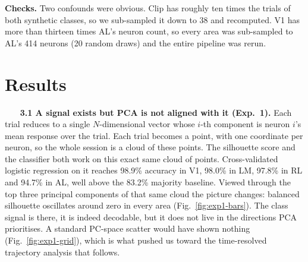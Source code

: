\documentclass[11pt,a4paper]{article}
\begin{document}
\textbf{Checks.} Two confounds were obvious. Clip has roughly ten times the trials of both synthetic classes, so we sub-sampled it down to 38 and recomputed. V1 has more than thirteen times AL's neuron count, so every area was sub-sampled to AL's 414 neurons (20 random draws) and the entire pipeline was rerun.

\section{Results}

$\quad$ \ \textbf{3.1 A signal exists but PCA is not aligned with it (Exp.~1).} Each trial reduces to a single $N$-dimensional vector whose $i$-th component is neuron $i$'s mean response over the trial. Each trial becomes a point, with one coordinate per neuron, so the whole session is a cloud of these points. The silhouette score and the classifier both work on this exact same cloud of points. Cross-validated logistic regression on it reaches 98.9\% accuracy in V1, 98.0\% in LM, 97.8\% in RL and 94.7\% in AL, well above the 83.2\% majority baseline. Viewed through the top three principal components of that same cloud the picture changes: balanced silhouette oscillates around zero in every area (Fig.~\ref{fig:exp1-bars}). The class signal is there, it is indeed decodable, but it does not live in the directions PCA prioritises. A standard PC-space scatter would have shown nothing (Fig.~\ref{fig:exp1-grid}), which is what pushed us toward the time-resolved trajectory analysis that follows.
\end{document}
